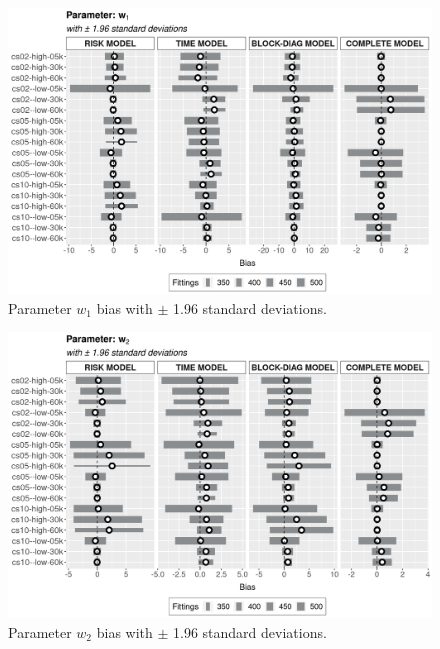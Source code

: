 \documentclass[a4paper,12pt]{article}
\begin{document}
\begin{figure}[H]
 \centering
 \includegraphics[width=\linewidth]{../../THESIS/thesis/figures/bias2plotsd-5.png}
 \vspace{-0.75cm}
 \caption{Parameter \(w_{1}\) bias with \(\pm\) 1.96 standard
   deviations.}
 \label{fig:biassdw1}
\end{figure}

\begin{figure}[H]
 \centering
 \includegraphics[width=\linewidth]{../../THESIS/thesis/figures/bias2plotsd-6.png}
 \vspace{-0.75cm}
 \caption{Parameter \(w_{2}\) bias with \(\pm\) 1.96 standard
   deviations.}
 \label{fig:biassdw2}
\end{figure}
\end{document}
